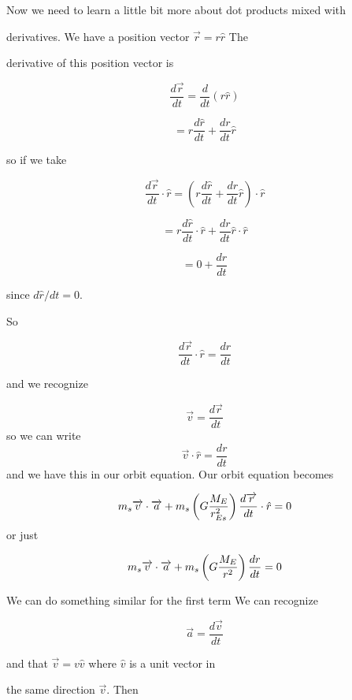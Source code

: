 Now we need to learn a little bit more about dot products mixed with

derivatives. We have a position vector $\overrightarrow{r}=r\hat{r}$ The

derivative of this position vector is 

$$\frac{d\overrightarrow{r}}{dt}=\frac{d}{dt}\left( r\hat{r}\right) $$

$$=r\frac{d\hat{r}}{dt}+\frac{dr}{dt}\hat{r}$$


so if we take 

$$\frac{d\overrightarrow{r}}{dt}\cdot \hat{r}=\left( r\frac{d\hat{r}}{dt}+\frac{dr}{dt}\hat{r}\right) \cdot \hat{r}$$


$$=r\frac{d\hat{r}}{dt}\cdot \hat{r}+\frac{dr}{dt}\hat{r}\cdot \hat{r}$$%

$$=0+\frac{dr}{dt}$$%

since $d\hat{r}/dt=0.$


So 

$$\frac{d\overrightarrow{r}}{dt}\cdot \hat{r}=\frac{dr}{dt}$$

and we recognize 

\begin{equation*}
	\overrightarrow{v}=\frac{d\overrightarrow{r}}{dt}
\end{equation*}%
so we can write 
\begin{equation}
	\overrightarrow{v}\cdot \hat{r}=\frac{dr}{dt}  \label{vdotrhat}
\end{equation}%
and we have this in our orbit equation. Our orbit equation becomes

\begin{equation*}
	m_{s}\overrightarrow{v}\cdot \overrightarrow{a}+m_{s}\left( G\frac{M_{E}}{%
		r_{Es}^{2}}\right) \frac{d\overrightarrow{r}}{dt}\cdot \hat{r}=0
\end{equation*}%
or just

\begin{equation*}
	m_{s}\overrightarrow{v}\cdot \overrightarrow{a}+m_{s}\left( G\frac{M_{E}}{%
		r^{2}}\right) \frac{dr}{dt}=0
\end{equation*}

We can do something similar for the first term We can recognize 

$$\overrightarrow{a}=\frac{d\overrightarrow{v}}{dt}$$

and that $\overrightarrow{v}=v\hat{v}$ where $\hat{v}$ is a unit vector in

the same direction $\overrightarrow{v}.$ Then 

